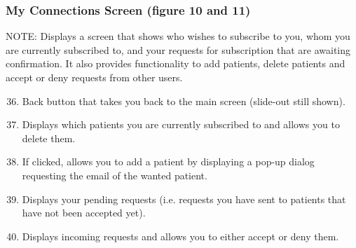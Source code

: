 \documentclass{article}
\begin{document}
\subsubsection{My Connections Screen (figure 10 and 11)}
NOTE: Displays a screen that shows who wishes to subscribe to you, whom you are currently subscribed to, and your requests for subscription that are awaiting confirmation. It also provides functionality to add patients, delete patients and accept or deny requests from other users. 
\begin{enumerate}
\setcounter{enumi}{35}
	\item Back button that takes you back to the main screen (slide-out still shown). 
	\item Displays which patients you are currently subscribed to and allows you to delete them. 
	\item If clicked, allows you to add a patient by displaying a pop-up dialog requesting the email of the wanted patient. 
	\item Displays your pending requests (i.e. requests you have sent to patients that have not been accepted yet). 
    \item Displays incoming requests and allows you to either accept or deny them. 
\end{enumerate}
\end{document}
